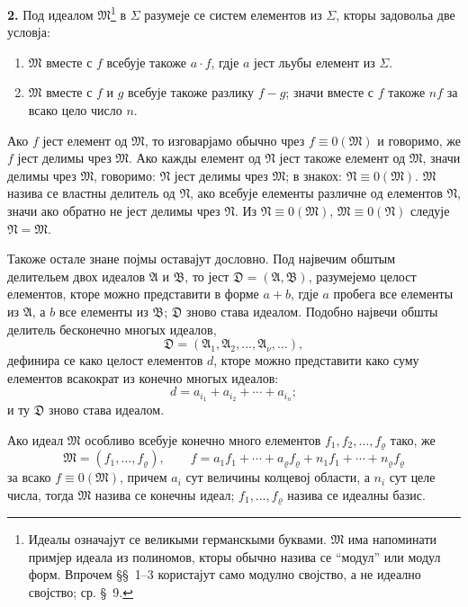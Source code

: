 ﻿\documentclass[11pt]{article}
\newcommand{\ideal}[1]{\mathfrak{#1}}
\begin{document}
\textbf{2.} Под идеалом \(\ideal M\)\footnote{Идеалы означајут се великыми германскыми буквами. \(\ideal M\) има напоминати примјер идеала из полиномов, кторы обычно назива се ``модул'' или модул форм. Впрочем \S\S~1--3 користајут само модулно својство, а не идеално својство; ср. \S~9.} в \(\Sigma\) разумеје се систем елементов из \(\Sigma\), кторы задовольа две условја:
\begin{enumerate}
\item \(\ideal M\) вместе с \(f\) всебује такоже \(a\cdot f\), гдје \(a\) јест льубы елемент из \(\Sigma\).
\item \(\ideal M\) вместе с \(f\) и \(g\) всебује такоже разлику \(f-g\); значи вместе с \(f\) такоже \(nf\) за всако цело число \(n\).
\end{enumerate}
Ако \(f\) јест елемент од \(\ideal M\), то изговарјамо обычно чрез \(f\equiv0(\ideal M)\) и говоримо, же \(f\) јест делимы чрез \(\ideal M\). Ако кажды елемент од \(\ideal N\) јест такоже елемент од \(\ideal M\), значи делимы чрез \(\ideal M\), говоримо: \(\ideal N\) јест делимы чрез \(\ideal M\); в знакох: \(\ideal N\equiv0(\ideal M)\). \(\ideal M\) назива се властны делитель од \(\ideal N\), ако всебује елементы различне од елементов \(\ideal N\), значи ако обратно не јест делимы чрез \(\ideal N\). Из \(\ideal N\equiv0(\ideal M)\), \(\ideal M\equiv0(\ideal N)\) следује \(\ideal N=\ideal M\).

Такоже остале знане појмы оставајут дословно. Под највечим обштым делительем двох идеалов \(\ideal A\) и \(\ideal B\), то јест \(\ideal D=(\ideal A,\ideal B)\), разумејемо целост елементов, кторе можно представити в форме \(a+b\), гдје \(a\) пробега все елементы из \(\ideal A\), а \(b\) все елементы из \(\ideal B\); \(\ideal D\) зново става идеалом. Подобно највечи обшты делитель бесконечно многых идеалов,
\[
 \ideal D=(\ideal A_1,\ideal A_2,\ldots,\ideal A_\nu,\ldots),
\]
дефинира се како целост елементов \(d\), кторе можно представити како суму елементов всакократ из конечно многых идеалов:
\[
 d=a_{i_1}+a_{i_2}+\cdots+a_{i_n};
\]
и ту \(\ideal D\) зново става идеалом.

Ако идеал \(\ideal M\) особливо всебује конечно много елементов \(f_1,f_2,\ldots,f_\varrho\) тако, же
\[
 \ideal M=(f_1,\ldots,f_\varrho),\qquad
 f=a_1f_1+\cdots+a_\varrho f_\varrho+n_1f_1+\cdots+n_\varrho f_\varrho
\]
за всако \(f\equiv0(\ideal M)\), причем \(a_i\) сут величины колцевој области, а \(n_i\) сут целе числа, тогда \(\ideal M\) назива се конечны идеал; \(f_1,\ldots,f_\varrho\) назива се идеалны базис.
\end{document}
